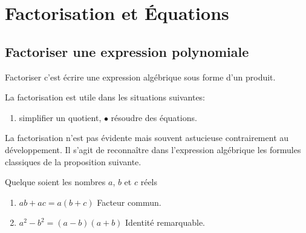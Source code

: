 \documentclass[a4paper,10pt]{report}
\begin{document}
\newpage
\setcounter{chapter}{8}
\chapter{Factorisation et Équations}

\section{Factoriser une expression polynomiale}

\begin{defn}
Factoriser c'est écrire une expression algébrique sous forme d'un produit.
\end{defn}

\noindent  La factorisation est utile dans les situations suivantes:
\begin{enumerate}
\item[•] simplifier un quotient,\hspace{5cm} $\bullet$ résoudre des équations.
\end{enumerate}
	
\medskip
\noindent La factorisation n'est pas évidente mais souvent astucieuse contrairement au développement. Il s'agit de reconnaître dans l'expression algébrique les formules classiques de la proposition suivante.

\begin{prop}
Quelque soient les nombres $a$, $b$ et $c$ réels
\begin{enumerate}
\item $ab+ac=a(b+c)$ \hspace{2cm} Facteur commun.
\item $a^2-b^2=(a-b)(a+b)$ \hspace{1.3cm} Identité remarquable.
\end{enumerate}
\end{prop}
\end{document}
